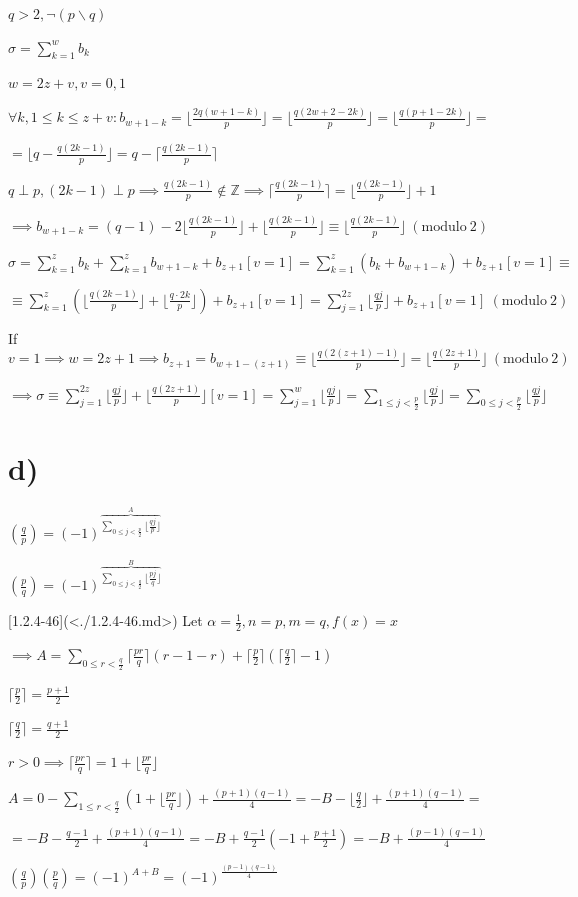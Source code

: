 \documentclass{article}
\begin{document}
$q > 2, \lnot(p \backslash q)$

$\sigma = \sum_{k=1}^w b_k$

$w = 2z + v, v = 0,1$

$\forall k, 1 \leq k \leq z + v: b_{w+1-k}= \lfloor{\frac{2q(w+1-k)}{p}}\rfloor = \lfloor{\frac{q(2w+2-2k)}{p}}\rfloor = \lfloor{\frac{q(p+1-2k)}{p}}\rfloor =$

$= \lfloor{q - \frac{q(2k-1)}{p}}\rfloor = q - \lceil\frac{q(2k-1)}{p}\rceil$

$q \perp p, (2k - 1) \perp p \implies \frac{q(2k-1)}{p} \notin \mathbb{Z} \implies \lceil\frac{q(2k-1)}{p}\rceil = \lfloor\frac{q(2k-1)}{p}\rfloor + 1$

$\implies b_{w+1-k} = (q - 1) - 2\lfloor\frac{q(2k-1)}{p}\rfloor + \lfloor\frac{q(2k-1)}{p}\rfloor \equiv \lfloor\frac{q(2k-1)}{p} \rfloor \ (\mathrm{modulo}\ 2)$

$\sigma = \sum_{k=1}^z b_k + \sum_{k=1}^z b_{w+1-k} + b_{z+1}[v=1] = \sum_{k=1}^z(b_k+b_{w+1-k}) + b_{z+1}[v=1] \equiv$

$\equiv \sum_{k=1}^z(\lfloor\frac{q(2k-1)}{p}\rfloor + \lfloor\frac{q\cdot 2k}{p}\rfloor) + b_{z+1}[v=1] = \sum_{j=1}^{2z} \lfloor\frac{qj}{p}\rfloor + b_{z+1}[v=1] \ (\mathrm{modulo}\ 2)$

If $v = 1 \implies w = 2z + 1 \implies b_{z+1} = b_{w+1-(z+1)} \equiv \lfloor{\frac{q(2(z+1)-1)}{p}}\rfloor = \lfloor{\frac{q(2z+1)}{p}}\rfloor \ (\mathrm{modulo}\ 2)$

$\implies \sigma \equiv \sum_{j=1}^{2z} \lfloor\frac{qj}{p}\rfloor + \lfloor{\frac{q(2z+1)}{p}}\rfloor[v=1] = \sum_{j=1}^{w} \lfloor\frac{qj}{p}\rfloor = \sum_{1 \leq j < \frac{p}{2}} \lfloor\frac{qj}{p}\rfloor = \sum_{0 \leq j < \frac{p}{2}} \lfloor\frac{qj}{p}\rfloor$

\section*{d)}

$(\frac{q}{p}) = (-1)^{\overbrace{\sum_{0 \leq j < \frac{p}{2}} \lfloor\frac{qj}{p}\rfloor}^A}$

$(\frac{p}{q}) = (-1)^{\overbrace{\sum_{0 \leq j < \frac{q}{2}} \lfloor\frac{pj}{q}\rfloor}^B}$

[1.2.4-46](<./1.2.4-46.md>) Let $\alpha = \frac{1}{2}, n = p, m = q, f(x) = x$

$\implies A = \sum_{0 \leq r < \frac{q}{2}}{\lceil\frac{pr}{q}\rceil} (r - 1 -r) + \lceil{\frac{p}{2}}\rceil(\lceil{\frac{q}{2}}\rceil - 1)$

$\lceil{\frac{p}{2}}\rceil = \frac{p+1}{2}$

$\lceil{\frac{q}{2}}\rceil = \frac{q+1}{2}$

$r > 0 \implies \lceil\frac{pr}{q}\rceil = 1 + \lfloor\frac{pr}{q}\rfloor$

$A = 0 - \sum_{1\leq r < \frac{q}{2}} (1 + \lfloor\frac{pr}{q}\rfloor) + \frac{(p+1)(q-1)}{4} = -B - \lfloor{\frac{q}{2}}\rfloor + \frac{(p+1)(q-1)}{4} =$

$= -B - \frac{q-1}{2} + \frac{(p+1)(q-1)}{4} = -B + \frac{q-1}{2}(-1 + \frac{p+1}{2}) = - B + \frac{(p-1)(q-1)}{4}$

$(\frac{q}{p})(\frac{p}{q}) = (-1)^{A+B} = (-1)^{\frac{(p-1)(q-1)}{4}}$
\end{document}
